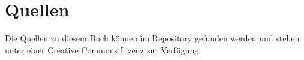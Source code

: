 %
%
%
\section{Quellen}
Die Quellen zu diesem Buch können im Repository
\cite{buch:repo} gefunden werden und stehen unter einer Creative Commons
Lizenz zur Verfügung.


